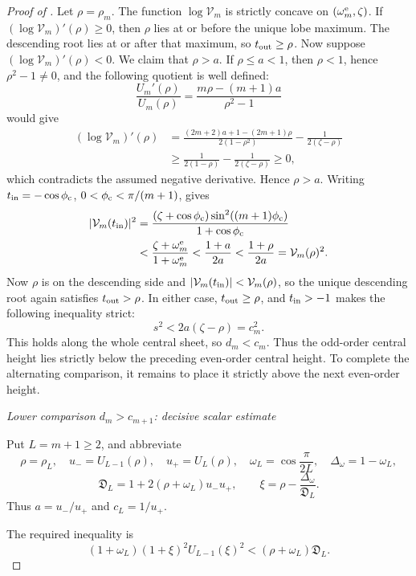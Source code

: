 \documentclass[12pt,anonymous]{iopjournal}
\numberwithin{equation}{section}
\theoremstyle{remark}
\newcommand{\proofstage}[1]{%
  \par\medskip\noindent\textit{#1}\par\nobreak\smallskip}
\begin{document}
\begin{proof}[Proof of ]
Let \(\rho=\rho_m\).  The function \(\log\mathcal V_m\) is strictly
concave on \((\omega_m^{\rm e},\zeta)\).  If
\((\log\mathcal V_m)'(\rho)\geq0\), then \(\rho\) lies at or before the
unique lobe maximum.  The descending root lies at or after that maximum, so
\(t_{\rm out}\geq\rho\).  Now suppose
\((\log\mathcal V_m)'(\rho)<0\).  We claim that \(\rho>a\).  If
\(\rho\leq a<1\), then \(\rho<1\), hence \(\rho^2-1\neq0\), and the
following quotient is well defined:
\[
 \frac{U_m'(\rho)}{U_m(\rho)}
 =\frac{m\rho-(m+1)a}{\rho^2-1}
\]
would give
\[
\begin{aligned}
 (\log\mathcal V_m)'(\rho)
 &=\frac{(2m+2)a+1-(2m+1)\rho}{2(1-\rho^2)}
   -\frac1{2(\zeta-\rho)}\\
 &\geq\frac1{2(1-\rho)}-\frac1{2(\zeta-\rho)}\geq0,
\end{aligned}
\]
which contradicts the assumed negative derivative.  Hence \(\rho>a\).
Writing \(t_{\rm in}=-\cos\phi_{\rm c}\),
\(0<\phi_{\rm c}<\pi/(m+1)\), gives
\[
\begin{aligned}
 |\mathcal V_m(t_{\rm in})|^2
 &=\frac{(\zeta+\cos\phi_{\rm c})
          \sin^2((m+1)\phi_{\rm c})}{1+\cos\phi_{\rm c}}\\
 &<\frac{\zeta+\omega_m^{\rm e}}{1+\omega_m^{\rm e}}
 <\frac{1+a}{2a}<\frac{1+\rho}{2a}=\mathcal V_m(\rho)^2.
\end{aligned}
\]
Now \(\rho\) is on the descending side and
\(|\mathcal V_m(t_{\rm in})|<\mathcal V_m(\rho)\), so the
unique descending root again satisfies \(t_{\rm out}>\rho\).  In either case,
\(t_{\rm out}\geq\rho\), and \(t_{\rm in}>-1\) makes the following
inequality strict:
\[
 s^2<2a(\zeta-\rho)=c_m^2.
\]
This holds along the whole central sheet, so \(d_m<c_m\).
Thus the odd-order central height lies strictly below the preceding
even-order central height.  To complete the alternating comparison, it
remains to place it strictly above the next even-order height.

\proofstage{Lower comparison \(d_m>c_{m+1}\): decisive scalar estimate}
Put \(L=m+1\geq2\), and abbreviate
\[
 \rho=\rho_L,\quad u_-=U_{L-1}(\rho),\quad u_+=U_L(\rho),\quad
 \omega_L=\cos\frac{\pi}{2L},\quad \Delta_\omega=1-\omega_L,
\]
\begin{equation}\label{eq:central-D-xi}
 \mathfrak D_L=1+2(\rho+\omega_L)u_-u_+,\qquad
 \xi=\rho-\frac{\Delta_\omega}{\mathfrak D_L}.
\end{equation}
Thus \(a=u_-/u_+\) and \(c_L=1/u_+\).

The required inequality is
\begin{equation}\label{eq:central-target}
 (1+\omega_L)(1+\xi)^2U_{L-1}(\xi)^2
 <(\rho+\omega_L)\mathfrak D_L.
\end{equation}


\end{proof}
\end{document}

